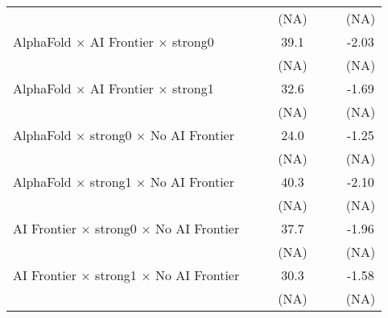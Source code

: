 \begin{tabular}{lcccccc}
                                                                              &                        &       & (NA)   &                        &       & (NA)\\   
   AlphaFold $\times$ AI Frontier $\times$ strong0                            &                        &       & 39.1   &                        &       & -2.03\\   
                                                                              &                        &       & (NA)   &                        &       & (NA)\\   
   AlphaFold $\times$ AI Frontier $\times$ strong1                            &                        &       & 32.6   &                        &       & -1.69\\   
                                                                              &                        &       & (NA)   &                        &       & (NA)\\   
   AlphaFold $\times$ strong0 $\times$ No AI Frontier                         &                        &       & 24.0   &                        &       & -1.25\\   
                                                                              &                        &       & (NA)   &                        &       & (NA)\\   
   AlphaFold $\times$ strong1 $\times$ No AI Frontier                         &                        &       & 40.3   &                        &       & -2.10\\   
                                                                              &                        &       & (NA)   &                        &       & (NA)\\   
   AI Frontier $\times$ strong0 $\times$ No AI Frontier                       &                        &       & 37.7   &                        &       & -1.96\\   
                                                                              &                        &       & (NA)   &                        &       & (NA)\\   
   AI Frontier $\times$ strong1 $\times$ No AI Frontier                       &                        &       & 30.3   &                        &       & -1.58\\   
                                                                              &                        &       & (NA)   &                        &       & (NA)\\   

\end{tabular}
